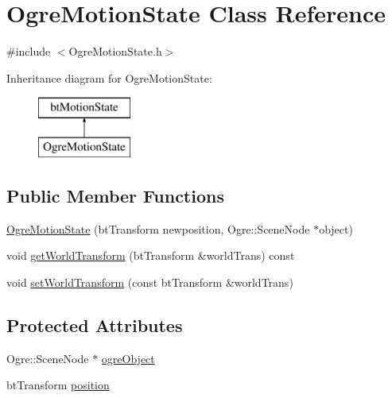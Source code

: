 \hypertarget{classOgreMotionState}{\section{Ogre\-Motion\-State Class Reference}
\label{classOgreMotionState}
}


{\ttfamily \#include $<$Ogre\-Motion\-State.\-h$>$}

Inheritance diagram for Ogre\-Motion\-State\-:\begin{figure}[H]
\begin{center}
\leavevmode
\includegraphics[height=2.000000cm]{classOgreMotionState}
\end{center}
\end{figure}
\subsection*{Public Member Functions}
\begin{DoxyCompactItemize}
\item 
\hyperlink{classOgreMotionState_ae162210352a5a02fc1fbdab71237db0d}{Ogre\-Motion\-State} (bt\-Transform newposition, Ogre\-::\-Scene\-Node $\ast$object)
\item 
void \hyperlink{classOgreMotionState_aad1bde58b7a70df4ac8a1eaa85f74c81}{get\-World\-Transform} (bt\-Transform \&world\-Trans) const 
\item 
void \hyperlink{classOgreMotionState_a1b923f3fb6eadf733bf3dcea718a36e0}{set\-World\-Transform} (const bt\-Transform \&world\-Trans)
\end{DoxyCompactItemize}
\subsection*{Protected Attributes}
\begin{DoxyCompactItemize}
\item 
Ogre\-::\-Scene\-Node $\ast$ \hyperlink{classOgreMotionState_ae7dba01fecff53c68da9b17d63c9d504}{ogre\-Object}
\item 
bt\-Transform \hyperlink{classOgreMotionState_a89f91947e958b56b14bfc5ee881e9f66}{position}
\end{DoxyCompactItemize}


